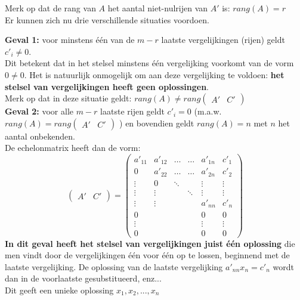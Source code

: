 Merk op dat de rang van $A$ het aantal niet-nulrijen van $A'$ is: $rang(A)=r$ \\

Er kunnen zich nu drie verschillende situaties voordoen.

\begin{ftonthoud} 
	{\bf Geval 1:} voor minstens \'{e}\'{e}n van de $m-r$ laatste vergelijkingen (rijen) geldt $c'_{i} \neq 0$.\\ Dit betekent dat in het stelsel minstens \'{e}\'{e}n vergelijking voorkomt van de vorm $0 \neq 0$. Het is natuurlijk onmogelijk om aan deze vergelijking te voldoen: {\bf het stelsel van vergelijkingen heeft geen oplossingen}.\\
	Merk op dat in deze situatie geldt: $rang(A) \neq rang \left( \begin{array}{c|c} A' & C' \end{array} \right)$ \\
	
	{\bf Geval 2:} voor alle $m-r$ laatste rijen geldt $c'_{i}=0$ (m.a.w. $rang(A) = rang \left( \begin{array}{c|c} A' & C' \end{array} \right)$ ) en bovendien geldt $rang(A)=n$ met $n$ het aantal onbekenden. \\
	De echelonmatrix heeft dan de vorm:
	\[
	\left( \begin{array}{c|c} A' & C' \end{array} \right) = 
	\left(
	\begin{array}{ccccc|c}
	a'_{11} & a'_{12} & \ldots & \ldots & a'_{1n} & c'_{1} \\
	0 & a'_{22} & \ldots & \ldots & a'_{2n} & c'_{2} \\
	\vdots & 0 & \ddots &  & \vdots & \vdots \\
	\vdots & \vdots & & \ddots & \vdots & \vdots \\
	\vdots & \vdots & & & a'_{nn} & c'_{n} \\
	0 & & & & 0 & 0 \\
	\vdots & & & & \vdots & \vdots \\
	0 & & & & 0 & 0
	\end{array} 
	\right) 
	\]
	{\bf In dit geval heeft het stelsel van vergelijkingen juist \'{e}\'{e}n oplossing} die men vindt door de vergelijkingen \'{e}\'{e}n voor \'{e}\'{e}n op te lossen, beginnend met de laatste vergelijking. De oplossing van de laatste vergelijking $a'_{nn} x_{n}=c'_{n}$ wordt dan in de voorlaatste gesubstitueerd, enz... \\
	Dit geeft een unieke oplossing $x_{1}, x_{2}, ... , x_{n}$ \\
	

\end{ftonthoud}
